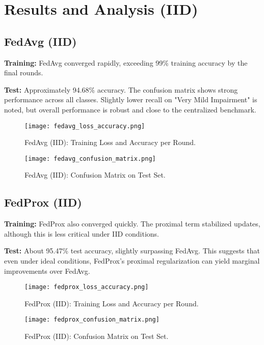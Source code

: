 \documentclass[12pt,a4paper]{report}
\begin{document}
\chapter{Results and Analysis (IID)}

\section{FedAvg (IID)}

\textbf{Training:} FedAvg converged rapidly, exceeding 99\% training accuracy by the final rounds.

\textbf{Test:} Approximately 94.68\% accuracy. The confusion matrix shows strong performance across all classes. Slightly lower recall on "Very Mild Impairment" is noted, but overall performance is robust and close to the centralized benchmark.

\begin{figure}[H]
	\centering
	\texttt{[image: fedavg\_loss\_accuracy.png]}
	\caption{FedAvg (IID): Training Loss and Accuracy per Round.}
\end{figure}

\begin{figure}[H]
	\centering
	\texttt{[image: fedavg\_confusion\_matrix.png]}
	\caption{FedAvg (IID): Confusion Matrix on Test Set.}
\end{figure}

\section{FedProx (IID)}

\textbf{Training:} FedProx also converged quickly. The proximal term stabilized updates, although this is less critical under IID conditions.

\textbf{Test:} About 95.47\% test accuracy, slightly surpassing FedAvg. This suggests that even under ideal conditions, FedProx’s proximal regularization can yield marginal improvements over FedAvg.

\begin{figure}[H]
	\centering
	\texttt{[image: fedprox\_loss\_accuracy.png]}
	\caption{FedProx (IID): Training Loss and Accuracy per Round.}
\end{figure}

\begin{figure}[H]
	\centering
	\texttt{[image: fedprox\_confusion\_matrix.png]}
	\caption{FedProx (IID): Confusion Matrix on Test Set.}
\end{figure}
\end{document}
